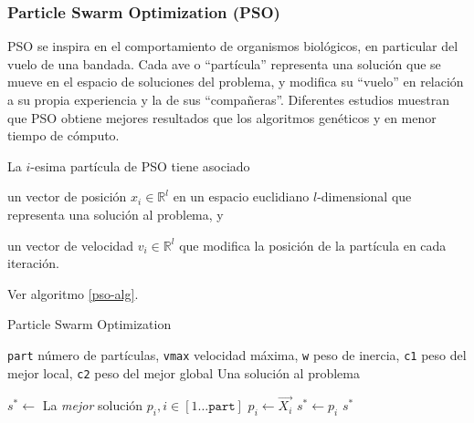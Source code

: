 \subsubsection{Particle Swarm Optimization (PSO)}

PSO \cite{kennedy1995particle} se inspira en el comportamiento de organismos biológicos, en particular del vuelo de una bandada. Cada ave o ``partícula'' representa una solución que se mueve en el espacio de soluciones del problema, y modifica su ``vuelo'' en relación a su propia experiencia y la de sus ``compañeras''. Diferentes estudios \cite{shi1998modified,kennedy1998matching} muestran que PSO obtiene mejores resultados que los algoritmos genéticos y en menor tiempo de cómputo.

La $i$-esima partícula de PSO tiene asociado
\begin{inparaenum}
\item un vector de posición $x_i \in \mathbb{R}^l$ en un espacio euclidiano $l$-dimensional que representa una solución al problema, y
\item un vector de velocidad $v_i \in \mathbb{R}^l$ que modifica la posición de la partícula en cada iteración.
\end{inparaenum}
Ver algoritmo \ref{pso-alg}.

\begin{algorithm}
\caption{Particle Swarm Optimization}
\label{pso-alg}
\begin{algorithmic}[1]

\Require \texttt{part} número de partículas,
	\texttt{vmax} velocidad máxima,
	\texttt{w} peso de inercia,
	\texttt{c1} peso del mejor local,
	\texttt{c2} peso del mejor global
\Ensure Una solución al problema

	 
\EndFor
\State $s^* \gets$ La \emph{mejor} solución $p_i, i \in [1 \dots \texttt{part}]$
			\State $p_i \gets \vec{X_i}$
				\State $s^* \gets p_i$
			\EndIf
		\EndIf
	\EndFor
\EndWhile
\State \Return $s^*$

\end{algorithmic}
\end{algorithm}

